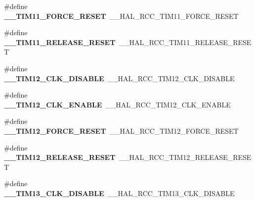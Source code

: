 \begin{DoxyCompactItemize}
\#define {\bfseries \+\_\+\+\_\+\+T\+I\+M11\+\_\+\+F\+O\+R\+C\+E\+\_\+\+R\+E\+S\+ET}~\+\_\+\+\_\+\+H\+A\+L\+\_\+\+R\+C\+C\+\_\+\+T\+I\+M11\+\_\+\+F\+O\+R\+C\+E\+\_\+\+R\+E\+S\+ET
\item 
\mbox{\label{group___h_a_l___r_c_c___aliased_ga824e2559156eae3f0a571246d3698431}} 
\#define {\bfseries \+\_\+\+\_\+\+T\+I\+M11\+\_\+\+R\+E\+L\+E\+A\+S\+E\+\_\+\+R\+E\+S\+ET}~\+\_\+\+\_\+\+H\+A\+L\+\_\+\+R\+C\+C\+\_\+\+T\+I\+M11\+\_\+\+R\+E\+L\+E\+A\+S\+E\+\_\+\+R\+E\+S\+ET
\item 
\mbox{\label{group___h_a_l___r_c_c___aliased_gab8ee1eb9468f1037ae0b82dae47b4e36}} 
\#define {\bfseries \+\_\+\+\_\+\+T\+I\+M12\+\_\+\+C\+L\+K\+\_\+\+D\+I\+S\+A\+B\+LE}~\+\_\+\+\_\+\+H\+A\+L\+\_\+\+R\+C\+C\+\_\+\+T\+I\+M12\+\_\+\+C\+L\+K\+\_\+\+D\+I\+S\+A\+B\+LE
\item 
\mbox{\label{group___h_a_l___r_c_c___aliased_gaa238e8a1840193501450360652992b0a}} 
\#define {\bfseries \+\_\+\+\_\+\+T\+I\+M12\+\_\+\+C\+L\+K\+\_\+\+E\+N\+A\+B\+LE}~\+\_\+\+\_\+\+H\+A\+L\+\_\+\+R\+C\+C\+\_\+\+T\+I\+M12\+\_\+\+C\+L\+K\+\_\+\+E\+N\+A\+B\+LE
\item 
\mbox{\label{group___h_a_l___r_c_c___aliased_gae56b393a7c3f23192414bb515d3e0ce7}} 
\#define {\bfseries \+\_\+\+\_\+\+T\+I\+M12\+\_\+\+F\+O\+R\+C\+E\+\_\+\+R\+E\+S\+ET}~\+\_\+\+\_\+\+H\+A\+L\+\_\+\+R\+C\+C\+\_\+\+T\+I\+M12\+\_\+\+F\+O\+R\+C\+E\+\_\+\+R\+E\+S\+ET
\item 
\mbox{\label{group___h_a_l___r_c_c___aliased_gab3ad7993389232812fa3634cb8f7909f}} 
\#define {\bfseries \+\_\+\+\_\+\+T\+I\+M12\+\_\+\+R\+E\+L\+E\+A\+S\+E\+\_\+\+R\+E\+S\+ET}~\+\_\+\+\_\+\+H\+A\+L\+\_\+\+R\+C\+C\+\_\+\+T\+I\+M12\+\_\+\+R\+E\+L\+E\+A\+S\+E\+\_\+\+R\+E\+S\+ET
\item 
\mbox{\label{group___h_a_l___r_c_c___aliased_gacfec356657ad501040bd9429cbdaa07f}} 
\#define {\bfseries \+\_\+\+\_\+\+T\+I\+M13\+\_\+\+C\+L\+K\+\_\+\+D\+I\+S\+A\+B\+LE}~\+\_\+\+\_\+\+H\+A\+L\+\_\+\+R\+C\+C\+\_\+\+T\+I\+M13\+\_\+\+C\+L\+K\+\_\+\+D\+I\+S\+A\+B\+LE
\item 
\mbox{\label{group___h_a_l___r_c_c___aliased_gaad8f664f4f9f4425f5ca94591107a7a7}} 

\end{DoxyCompactItemize}
